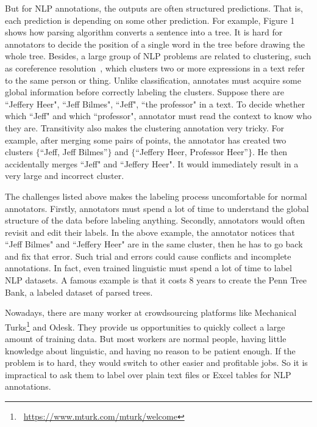 But for NLP annotations, the outputs are often structured predictions. That is, each prediction is depending on some other prediction. For example, Figure 1 shows how parsing algorithm converts a sentence into a tree. It is hard for annotators to decide the position of a single word in the tree before drawing the whole tree. Besides, a large group of NLP problems are related to clustering, such as coreference resolution~\cite{lee2011stanford}, which clusters two or more expressions in a text refer to the same person or thing. Unlike classification, annotates must acquire some global information before correctly labeling the clusters. Suppose there are ``Jeffery Heer", ``Jeff Bilmes", ``Jeff", ``the professor" in a text. To decide whether which ``Jeff" and which ``professor", annotator must read the context to know who they are. Transitivity also makes the clustering annotation very tricky. For example, after merging some pairs of points, the annotator has created two clusters $\{$``Jeff, Jeff Bilmes''$\}$ and $\{$``Jeffery Heer, Professor Heer''$\}$. He then accidentally merges ``Jeff" and ``Jeffery Heer".  It would immediately result in a very large and incorrect cluster.


The challenges listed above makes the labeling process uncomfortable for normal annotators. Firstly, annotators must spend a lot of time to understand the global structure of the data before labeling anything. Secondly, annotators would often revisit and edit their labels. In the above example, the annotator notices that ``Jeff Bilmes" and ``Jeffery Heer" are in the same cluster, then he has to go back and fix that error. Such trial and errors could cause conflicts and incomplete annotations. In fact, even trained linguistic must spend a lot of time to label NLP datasets. A famous example is that it costs 8 years to create the Penn Tree Bank, a labeled dataset of parsed trees. 

Nowadays, there are many worker at crowdsourcing platforms like Mechanical Turks\footnote{~\url{https://www.mturk.com/mturk/welcome}} and Odesk. They provide us opportunities to quickly collect a large amount of training data. But most workers are normal people, having little knowledge about linguistic, and having no reason to be patient enough. If the problem is to hard, they would switch to other easier and profitable jobs. So it is impractical to ask them to label over plain text files or Excel tables for NLP annotations.  